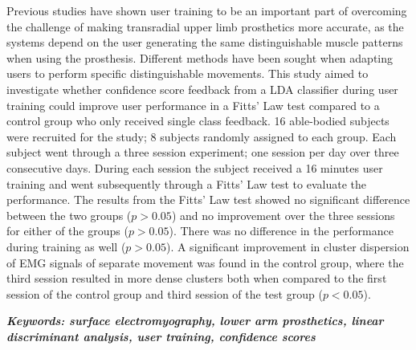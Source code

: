 

Previous studies have shown user training to be an important part of overcoming the challenge of making transradial upper limb prosthetics more accurate, as the systems depend on the user generating the same distinguishable muscle patterns when using the prosthesis. Different methods have been sought when adapting users to perform specific distinguishable movements. This study aimed to investigate whether confidence score feedback from a LDA classifier during user training could improve user performance in a Fitts' Law test compared to a control group who only received single class feedback. %
16 able-bodied subjects were recruited for the study; 8 subjects randomly assigned to each group. Each subject went through a three session experiment; one session per day over three consecutive days. During each session the subject received a 16 minutes user training and went subsequently through a Fitts' Law test to evaluate the performance.
The results from the Fitts' Law test showed no significant difference between the two groups ($p > 0.05$) and no improvement over the three sessions for either of the groups ($p > 0.05$). There was no difference in the performance during training as well ($p > 0.05$). A significant improvement in cluster dispersion of EMG signals of separate movement was found in the control group, where the third session resulted in more dense clusters both when compared to the first session of the control group and third session of the test group ($p < 0.05$).

\textit{\textbf{Keywords: surface electromyography, lower arm prosthetics, linear discriminant analysis, user training, confidence scores}}